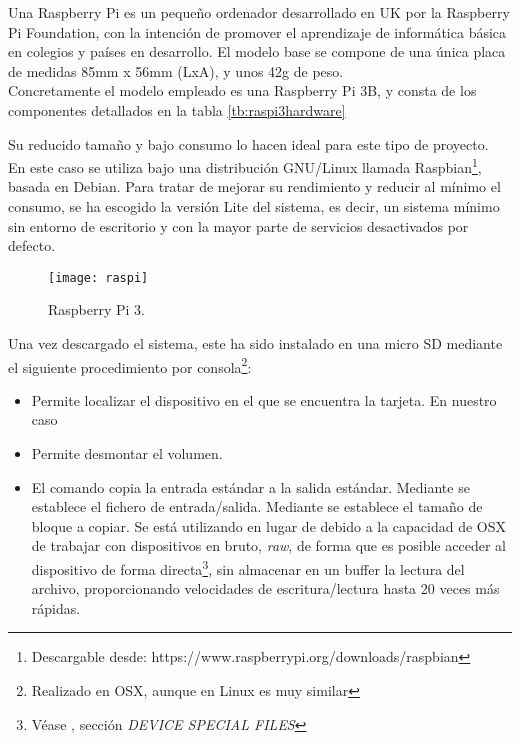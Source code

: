 \noindent Una Raspberry Pi es un pequeño ordenador desarrollado en UK por la Raspberry Pi Foundation, con la intención de promover el aprendizaje de informática básica en colegios y países en desarrollo. El modelo base se compone de una única placa de medidas 85mm x 56mm (LxA), y unos 42g de peso.\\Concretamente el modelo empleado es una Raspberry Pi 3B, y consta de los componentes detallados en la tabla \ref{tb:raspi3hardware}



\noindent Su reducido tamaño y bajo consumo lo hacen ideal para este tipo de proyecto. \\En este caso se utiliza bajo una distribución GNU/Linux llamada Raspbian\footnote{Descargable desde: https://www.raspberrypi.org/downloads/raspbian}, basada en Debian. Para tratar de mejorar su rendimiento y reducir al mínimo el consumo, se ha escogido la versión Lite del sistema, es decir, un sistema mínimo sin entorno de escritorio y con la mayor parte de servicios desactivados por defecto.

\begin{figure}
	\centering
	\texttt{[image: raspi]}
	\caption{Raspberry Pi 3.}\label{fig:raspi3b}
\end{figure}

Una vez descargado el sistema, este ha sido instalado en una micro SD mediante el siguiente procedimiento por consola\footnote{Realizado en OSX, aunque en Linux es muy similar}:
\begin{itemize}
\item{} Permite localizar el dispositivo en el que se encuentra la tarjeta. En nuestro caso 
\item{} Permite desmontar el volumen. 
\item{} El comando  copia la entrada estándar a la salida estándar. Mediante  se establece el fichero de entrada/salida. Mediante  se establece el tamaño de bloque a copiar. Se está utilizando  en lugar de  debido a la capacidad de OSX de trabajar con dispositivos en bruto, \textit{raw}, de forma que es posible acceder al dispositivo de forma directa\footnote{Véase , sección \textit{DEVICE SPECIAL FILES}}, sin almacenar en un buffer la lectura del archivo, proporcionando velocidades de escritura/lectura hasta 20 veces más rápidas.
\end{itemize}


